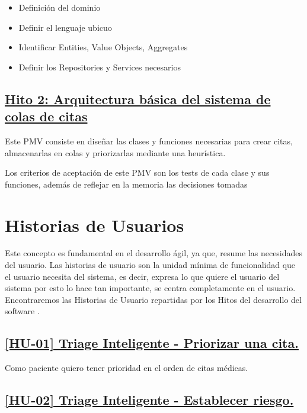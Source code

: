 \begin{itemize}
    \item {Definición del dominio}
    \item {Definir el lenguaje ubicuo}
    \item {Identificar Entities, Value Objects, Aggregates}
    \item {Definir los Repositories y Services necesarios}
\end{itemize}


\subsection*{\href{https://github.com/RubenDelgadoPareja/TFG-Triage-Inteligente-Consulta-Medica/milestone/2}{Hito 2: Arquitectura básica del sistema de colas de citas}}

Este PMV consiste en diseñar las clases y funciones necesarias para crear citas, almacenarlas en colas y priorizarlas mediante una heurística.

Los criterios de aceptación de este PMV son los tests de cada clase y sus funciones, además de reflejar en la memoria las decisiones tomadas

\section{Historias de Usuarios}
Este concepto es fundamental en el desarrollo ágil, ya que, resume las necesidades del usuario.
Las historias de usuario son la unidad mínima de funcionalidad que el usuario necesita del sistema, es decir,
expresa lo que quiere el usuario del sistema por esto lo hace tan importante, se centra completamente en el
usuario. Encontraremos las Historias de Usuario repartidas por los Hitos del desarrollo del software .


\subsection*{\href{https://github.com/RubenDelgadoPareja/TFG-Triage-Inteligente-Consulta-Medica/issues/19}{[HU-01] Triage Inteligente - Priorizar una cita.}}

Como paciente quiero tener prioridad en el orden de citas médicas.

\subsection*{\href{https://github.com/RubenDelgadoPareja/TFG-Triage-Inteligente-Consulta-Medica/issues/5}{[HU-02] Triage Inteligente - Establecer riesgo.}}

